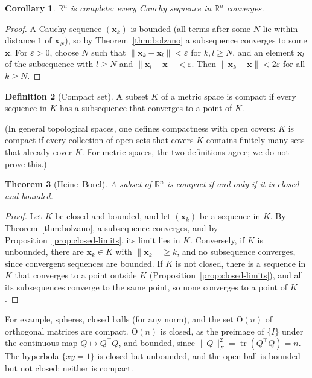 \documentclass[11pt]{article}
\newcommand{\norm}[1]{\lVert #1 \rVert}
\theoremstyle{definition}
\newtheorem{definition}{Definition}[section]
\theoremstyle{plain}
\newtheorem{theorem}[definition]{Theorem}
\newtheorem{corollary}[definition]{Corollary}
\theoremstyle{remark}
\DeclareMathOperator{\tr}{tr}
\begin{document}
\begin{corollary}\label{cor:complete}
    $\mathbb{R}^n$ is complete: every Cauchy sequence in $\mathbb{R}^n$ converges.
\end{corollary}

\begin{proof}
    A Cauchy sequence $(\mathbf{x}_k)$ is bounded (all terms after some $N$ lie within distance $1$ of $\mathbf{x}_N$), so by Theorem~\ref{thm:bolzano} a subsequence converges to some $\mathbf{x}$. For $\varepsilon > 0$, choose $N$ such that $\norm{\mathbf{x}_k - \mathbf{x}_l} < \varepsilon$ for $k, l \geq N$, and an element $\mathbf{x}_l$ of the subsequence with $l \geq N$ and $\norm{\mathbf{x}_l - \mathbf{x}} < \varepsilon$. Then $\norm{\mathbf{x}_k - \mathbf{x}} < 2\varepsilon$ for all $k \geq N$.
\end{proof}

\begin{definition}[Compact set]\label{def:compact}
    A subset $K$ of a metric space is compact if every sequence in $K$ has a subsequence that converges to a point of $K$.
\end{definition}

(In general topological spaces, one defines compactness with open covers: $K$ is compact if every collection of open sets that covers $K$ contains finitely many sets that already cover $K$. For metric spaces, the two definitions agree; we do not prove this.)

\begin{theorem}[Heine--Borel]\label{thm:heine-borel}
    A subset of $\mathbb{R}^n$ is compact if and only if it is closed and bounded.
\end{theorem}

\begin{proof}
    Let $K$ be closed and bounded, and let $(\mathbf{x}_k)$ be a sequence in $K$. By Theorem~\ref{thm:bolzano}, a subsequence converges, and by Proposition~\ref{prop:closed-limits}, its limit lies in $K$. Conversely, if $K$ is unbounded, there are $\mathbf{x}_k \in K$ with $\norm{\mathbf{x}_k} \geq k$, and no subsequence converges, since convergent sequences are bounded. If $K$ is not closed, there is a sequence in $K$ that converges to a point outside $K$ (Proposition~\ref{prop:closed-limits}), and all its subsequences converge to the same point, so none converges to a point of $K$.
\end{proof}

For example, spheres, closed balls (for any norm), and the set $\mathrm{O}(n)$ of orthogonal matrices are compact. $\mathrm{O}(n)$ is closed, as the preimage of $\{I\}$ under the continuous map $Q \mapsto Q^\top Q$, and bounded, since $\norm{Q}_F^2 = \tr(Q^\top Q) = n$. The hyperbola $\{xy = 1\}$ is closed but unbounded, and the open ball is bounded but not closed; neither is compact.
\end{document}
